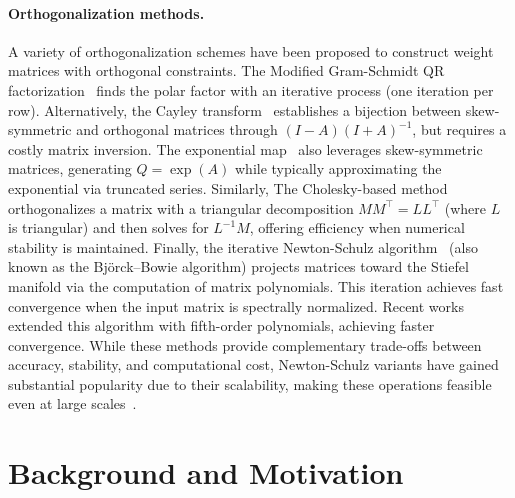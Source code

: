 \paragraph{Orthogonalization methods.} 
A variety of orthogonalization schemes have been proposed to construct weight matrices with orthogonal constraints.
The Modified Gram-Schmidt QR factorization~\citep{LaPlace1820} finds the polar factor with an iterative process (one iteration per row). 
Alternatively, the Cayley transform~\citep{Cayley_1846} establishes a bijection between skew-symmetric and orthogonal matrices through $(I-A)(I+A)^{-1}$, but requires a costly matrix inversion.
The exponential map~\citep{singla_skew_2021} also leverages skew-symmetric matrices, generating $Q=\exp(A)$ while typically approximating the exponential via truncated series. 
Similarly, The Cholesky-based method~\citep{hu_recipe_2023} orthogonalizes a matrix with a triangular decomposition $MM^\top=L L^\top$ (where $L$ is triangular) and then solves for $L^{-1}M$, offering efficiency when numerical stability is maintained. 
Finally, the iterative Newton-Schulz algorithm~\citep{bjorck1971iterative,anil_sorting_2019} (also known as the Bj\"orck--Bowie algorithm) projects matrices toward the Stiefel manifold via the computation of matrix polynomials.
This iteration achieves fast convergence when the input matrix is spectrally normalized.
Recent works~\cite{jordan2024muon, cesista2025muonoptcoeffs} extended this algorithm with fifth-order polynomials, achieving faster convergence.
While these methods provide complementary trade-offs between accuracy, stability, and computational cost, Newton-Schulz variants have gained substantial popularity due to their scalability, making these operations feasible even at large scales~\cite {kimi2025k2}.

\section{Background and Motivation}
\label{sec:bgnd_motiv}

